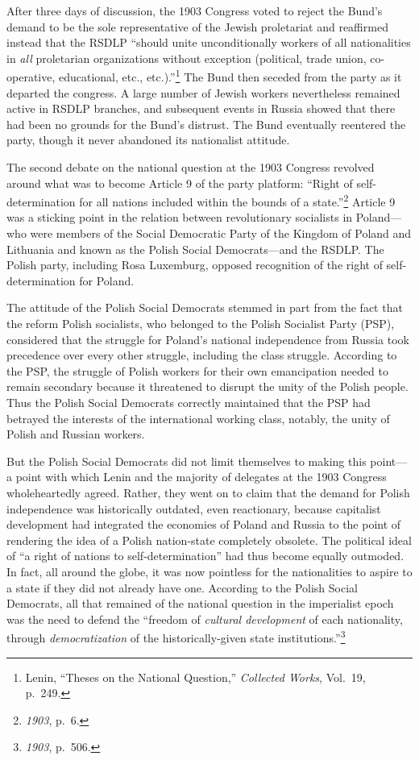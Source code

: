 After three days of discussion, the 1903 Congress voted to reject the Bund's demand to be the sole representative of the Jewish proletariat and reaffirmed instead that the RSDLP ``should unite unconditionally workers of all nationalities in \emph{all} proletarian organizations without exception (political, trade union, co-operative, educational, etc., etc.).''\footnote{Lenin, ``Theses on the National Question,'' \emph{Collected Works}, Vol.\ 19, p.\ 249.} The Bund then seceded from the party as it departed the congress. A large number of Jewish workers nevertheless remained active in RSDLP branches, and subsequent events in Russia showed that there had been no grounds for the Bund's distrust. The Bund eventually reentered the party, though it never abandoned its nationalist attitude.

The second debate on the national question at the 1903 Congress revolved around what was to become Article 9 of the party platform: ``Right of self-determination for all nations included within the bounds of a state.''\footnote{\emph{1903}, p.\ 6.} Article 9 was a sticking point in the relation between revolutionary socialists in Poland---who were members of the Social Democratic Party of the Kingdom of Poland and Lithuania and known as the Polish Social Democrats---and the RSDLP. The Polish party, including Rosa Luxemburg, opposed recognition of the right of self-determination for Poland.

The attitude of the Polish Social Democrats stemmed in part from the fact that the reform Polish socialists, who belonged to the Polish Socialist Party (PSP), considered that the struggle for Poland's national independence from Russia took precedence over every other struggle, including the class struggle. According to the PSP, the struggle of Polish workers for their own emancipation needed to remain secondary because it threatened to disrupt the unity of the Polish people. Thus the Polish Social Democrats correctly maintained that the PSP had betrayed the interests of the international working class, notably, the unity of Polish and Russian workers.

But the Polish Social Democrats did not limit themselves to making this point---a point with which Lenin and the majority of delegates at the 1903 Congress wholeheartedly agreed. Rather, they went on to claim that the demand for Polish independence was historically outdated, even reactionary, because capitalist development had integrated the economies of Poland and Russia to the point of rendering the idea of a Polish nation-state completely obsolete. The political ideal of ``a right of nations to self-determination'' had thus become equally outmoded. In fact, all around the globe, it was now pointless for the nationalities to aspire to a state if they did not already have one. According to the Polish Social Democrats, all that remained of the national question in the imperialist epoch was the need to defend the ``freedom of \emph{cultural development} of each nationality, through \emph{democratization} of the historically-given state institutions.''\footnote{\emph{1903}, p.\ 506.}

